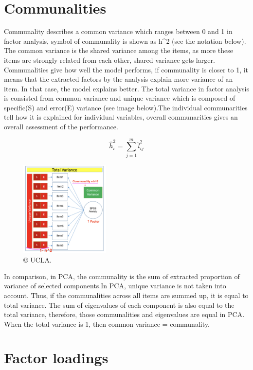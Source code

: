 \documentclass[]{book}
\begin{document}
\hypertarget{communalities}{%
\section{Communalities}\label{communalities}}

Communality describes a common variance which ranges between 0 and 1 in factor analysis, symbol of communality is shown as h\^{}2 (see the notation below). The common variance is the shared variance among the items, as more these items are strongly related from each other, shared variance gets larger. Communalities give how well the model performs, if communality is closer to 1, it means that the extracted factors by the analysis explain more variance of an item. In that case, the model explains better. The total variance in factor analysis is consisted from common variance and unique variance which is composed of specific(S) and error(E) variance (see image below).The individual communarities tell how it is explained for individual variables, overall communarities gives an overall assessment of the performance.

\[
\hat{h}_i^2 = {\sum_{j=1}^m} \hat{l}_{ij}^2
\]

\begin{figure}
\centering
\includegraphics[width=0.4\textwidth,height=\textheight]{Communality.png}
\caption{© UCLA.}
\end{figure}

In comparison, in PCA, the communality is the sum of extracted proportion of variance of selected components.In PCA, unique variance is not taken into account. Thus, if the communalities across all items are summed up, it is equal to total variance. The sum of eigenvalues of each component is also equal to the total variance, therefore, those communalities and eigenvalues are equal in PCA.
When the total variance is 1, then common variance = communality.

\hypertarget{factor-loadings}{%
\section{Factor loadings}\label{factor-loadings}}
\end{document}
